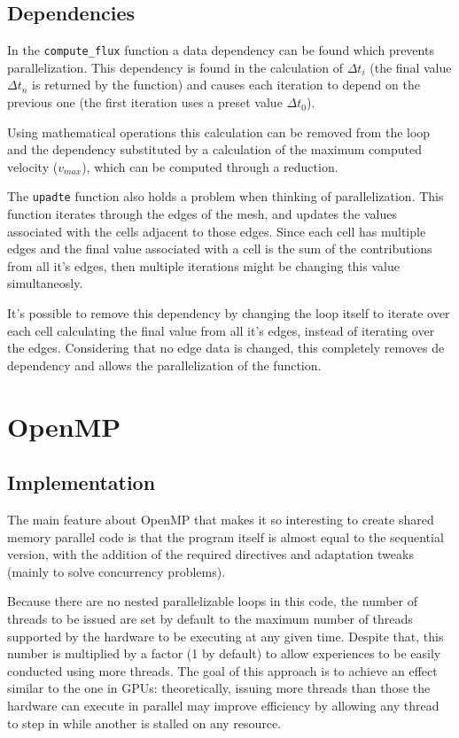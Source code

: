 \documentclass[9pt,twocolumn]{scrartcl}
\begin{document}
\subsection{Dependencies}
In the \texttt{compute\_flux} function a data dependency can be found which prevents parallelization. This dependency is found in the calculation of $\Delta t_{i}$ (the final value $\Delta t_{n}$ is returned by the function) and causes each iteration to depend on the previous one (the first iteration uses a preset value $\Delta t_{0}$).

Using mathematical operations this calculation can be removed from the loop and the dependency substituted by a calculation of the maximum computed velocity ($v_{max}$), which can be computed through a reduction.

The \texttt{upadte} function also holds a problem when thinking of parallelization. This function iterates through the edges of the mesh, and updates the values associated with the cells adjacent to those edges. Since each cell has multiple edges and the final value associated with a cell is the sum of the contributions from all it's edges, then multiple iterations might be changing this value simultaneosly.

It's possible to remove this dependency by changing the loop itself to iterate over each cell calculating the final value from all it's edges, instead of iterating over the edges. Considering that no edge data is changed, this completely removes de dependency and allows the parallelization of the function.

\section{OpenMP}
\label{sec:openmp}
\subsection{Implementation}
The main feature about OpenMP that makes it so interesting to create shared memory parallel code is that the program itself is almost equal to the sequential version, with the addition of the required directives and adaptation tweaks (mainly to solve concurrency problems).

Because there are no nested parallelizable loops in this code, the number of threads to be issued are set by default to the maximum number of threads supported by the hardware to be executing at any given time. Despite that, this number is multiplied by a factor (1 by default) to allow experiences to be easily conducted using more threads. The goal of this approach is to achieve an effect similar to the one in GPUs: theoretically, issuing more threads than those the hardware can execute in parallel may improve efficiency by allowing any thread to step in while another is stalled on any resource.
\end{document}
